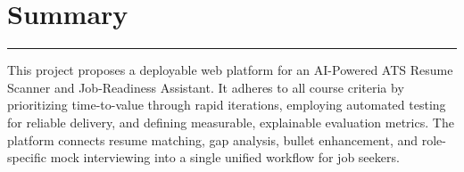 \documentclass[11pt,a4paper]{article}
\newcommand{\BvrSectionRule}{%
  \par\nobreak\vspace{0.25em}%
  \noindent\rule{\linewidth}{0.4pt}%
  \par\nobreak\vspace{0.4em}%
}
\begin{document}
\section{Summary}
\BvrSectionRule
This project proposes a deployable web platform for an
AI-Powered ATS Resume Scanner and Job-Readiness Assistant. It
adheres to all course criteria by prioritizing time-to-value
through rapid iterations, employing automated testing for
reliable delivery, and defining measurable, explainable
evaluation metrics. The platform connects resume matching,
gap analysis, bullet enhancement, and role-specific mock
interviewing into a single unified workflow for job seekers.
\end{document}
